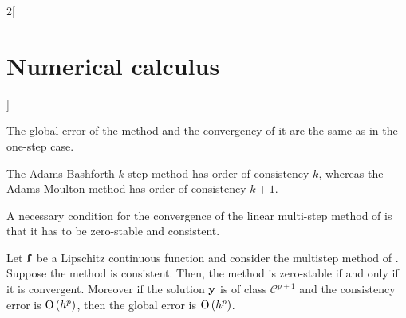\documentclass[../../../main_math.tex]{subfiles}
\begin{document}
\begin{multicols}{2}[\section{Numerical calculus}]
\begin{definition}
  \end{definition}
  \begin{remark}
    The global error of the method and the convergency of it are the same as in the one-step case.
  \end{remark}
  \begin{proposition}
    The Adams-Bashforth $k$-step method has order of consistency $k$, whereas the Adams-Moulton method has order of consistency $k+1$.
  \end{proposition}
  \begin{theorem}
    A necessary condition for the convergence of the linear multi-step method of  is that it has to be zero-stable and consistent.
  \end{theorem}
  \begin{theorem}
    Let $\boldsymbol{\mathrm{f}}$ be a Lipschitz continuous function and consider the multistep method of . Suppose the method is consistent. Then, the method is zero-stable if and only if it is convergent. Moreover if the solution $\boldsymbol{\mathrm{y}}$ is of class $\mathcal{C}^{p+1}$ and the consistency error is $\mathrm{O}\left(h^p\right)$, then the global error is $\mathrm{O}\left(h^{p}\right)$.
  \end{theorem}

\end{multicols}
\end{document}
